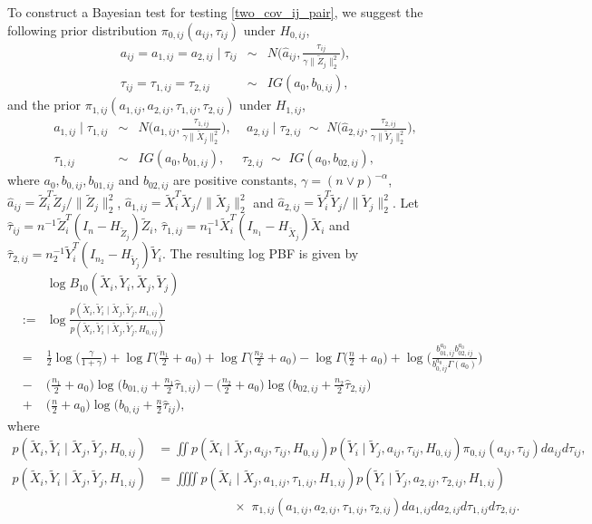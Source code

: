 \documentclass[11pt]{article}
\newcommand{\bea}{\begin{eqnarray*}}
\newcommand{\eea}{\end{eqnarray*}}
\newcommand{\bean}{\begin{eqnarray}}
\newcommand{\eean}{\end{eqnarray}}
\newcommand{\what}{\widehat}
\begin{document}
To construct a Bayesian test for testing \eqref{two_cov_ij_pair}, we suggest the following prior distribution $\pi_{0,ij}(a_{ij}, \tau_{ij})$ under $H_{0,ij}$,
\bea
a_{ij}=a_{1,ij}=a_{2,ij}\mid \tau_{ij} &\sim& N\Big( \what{a}_{ij}, \frac{\tau_{ij}}{\gamma \|\tilde{Z}_j\|_2^2 } \Big), \\
\tau_{ij} = \tau_{1,ij} = \tau_{2,ij} &\sim& IG(a_0, b_{0,ij}) ,
\eea
and the prior $\pi_{1,ij}(a_{1,ij}, a_{2,ij},\tau_{1,ij}, \tau_{2,ij})$ under $H_{1,ij}$,
\bea
a_{1,ij}\mid \tau_{1,ij} &\sim& N\Big(\what{a}_{1,ij}, \frac{\tau_{1,ij}}{\gamma\|\tilde{X}_j\|_2^2} \Big), \,\quad
a_{2,ij}\mid \tau_{2,ij} \,\,\sim\,\, N\Big(\what{a}_{2,ij} , \frac{\tau_{2,ij}}{\gamma\|\tilde{Y}_j\|_2^2} \Big), \\
\tau_{1,ij} &\sim& IG(a_0, b_{01,ij}), \,\,\quad \tau_{2,ij} \,\,\sim\,\, IG(a_0, b_{02,ij}) ,
\eea
where $a_0, b_{0,ij}, b_{01,ij}$ and $b_{02,ij}$ are positive constants, $\gamma = (n\vee p)^{-\alpha}$, $\what{a}_{ij} = \tilde{Z}_i^T \tilde{Z}_j / \|\tilde{Z}_j\|_2^2$, $\what{a}_{1,ij} = \tilde{X}_i^T \tilde{X}_j / \|\tilde{X}_j\|_2^2$ and $\what{a}_{2,ij} = \tilde{Y}_i^T \tilde{Y}_j / \|\tilde{Y}_j\|_2^2$.
Let $\what{\tau}_{ij} = n^{-1}\tilde{Z}_i^T(I_n - H_{\tilde{Z}_j} )\tilde{Z}_i$, $\what{\tau}_{1,ij} = n_1^{-1}\tilde{X}_i^T(I_{n_1} -  H_{\tilde{X}_j} )\tilde{X}_i$ and  $\what{\tau}_{2,ij} = n_2^{-1}\tilde{Y}_i^T(I_{n_2} - H_{\tilde{Y}_j} )\tilde{Y}_i$.
The resulting log PBF is given by
\bean
&& \log B_{10}(\tilde{X}_i, \tilde{Y}_i, \tilde{X}_j,\tilde{Y}_j) \label{B10_two_cov} \\
&:=& \log \frac{p(\tilde{X}_i, \tilde{Y}_i \mid \tilde{X}_j, \tilde{Y}_j, H_{1,ij})}{p(\tilde{X}_i, \tilde{Y}_i \mid \tilde{X}_j, \tilde{Y}_j, H_{0,ij})} \nonumber \\
&=& \frac{1}{2}\log \Big(\frac{\gamma}{1+\gamma} \Big) + \log \Gamma\Big(\frac{n_1}{2}+a_0 \Big) + \log \Gamma\Big(\frac{n_2}{2}+a_0 \Big) - \log \Gamma\Big(\frac{n}{2}+a_0 \Big) + \log \Big(\frac{b_{01,ij}^{a_0} b_{02,ij}^{a_0}}{b_{0,ij}^{a_0}\Gamma(a_0)} \Big) \nonumber \\
&-& \Big(\frac{n_1}{2}+a_0 \Big) \log \big(b_{01,ij} +\frac{n_1}{2}\what{\tau}_{1,ij} \big) - \Big(\frac{n_2}{2}+a_0 \Big) \log \big(b_{02,ij} +\frac{n_2}{2}\what{\tau}_{2,ij} \big) \label{leading1_hat} \\
&+& \Big(\frac{n}{2}+a_0 \Big) \log \big(b_{0,ij} + \frac{n}{2}\what{\tau}_{ij} \big), \label{leading2_hat}
\eean
where 
\begin{align*}
	p(\tilde{X}_i, \tilde{Y}_i \mid \tilde{X}_j, \tilde{Y}_j, H_{0,ij}) &= \iint p(\tilde{X}_i \mid \tilde{X}_j, a_{ij},\tau_{ij}, H_{0,ij}) p(\tilde{Y}_i \mid \tilde{Y}_j, a_{ij},\tau_{ij}, H_{0,ij}) \pi_{0,ij}(a_{ij},\tau_{ij}) d a_{ij} d\tau_{ij}   , \\
	p(\tilde{X}_i, \tilde{Y}_i \mid \tilde{X}_j, \tilde{Y}_j, H_{1,ij}) &= \iiiint p(\tilde{X}_i \mid \tilde{X}_j, a_{1,ij},\tau_{1,ij}, H_{1,ij}) p(\tilde{Y}_i \mid \tilde{Y}_j, a_{2,ij},\tau_{2,ij}, H_{1,ij}) \\
	& \quad\quad\quad\quad\quad\quad \times\,\, \pi_{1,ij}(a_{1,ij},a_{2,ij},\tau_{1,ij},\tau_{2,ij}) d a_{1,ij} da_{2,ij}d\tau_{1,ij}d \tau_{2,ij} .
\end{align*}
\end{document}
